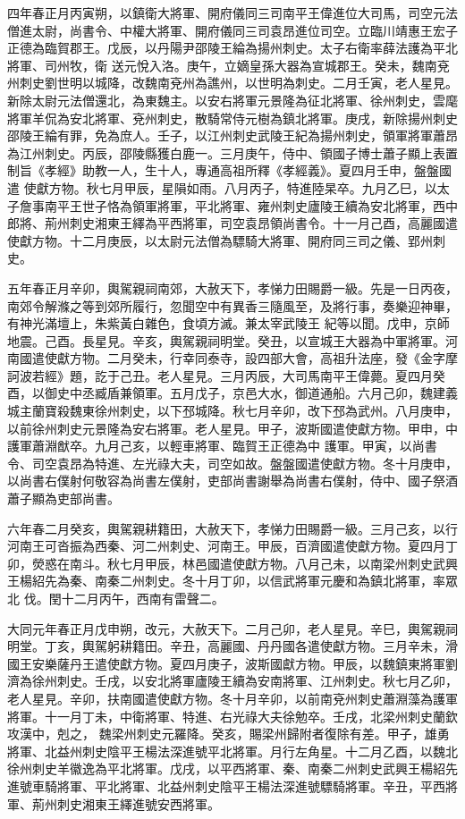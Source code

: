 \begin{pinyinscope}
 四年春正月丙寅朔，以鎮衛大將軍、開府儀同三司南平王偉進位大司馬，司空元法僧進太尉，尚書令、中權大將軍、開府儀同三司袁昂進位司空。立臨川靖惠王宏子正德為臨賀郡王。戊辰，以丹陽尹邵陵王綸為揚州刺史。太子右衛率薛法護為平北將軍、司州牧，衛
 送元悅入洛。庚午，立嫡皇孫大器為宣城郡王。癸未，魏南兗州刺史劉世明以城降，改魏南兗州為譙州，以世明為刺史。二月壬寅，老人星見。新除太尉元法僧還北，為東魏主。以安右將軍元景隆為征北將軍、徐州刺史，雲麾將軍羊侃為安北將軍、兗州刺史，散騎常侍元樹為鎮北將軍。庚戌，新除揚州刺史邵陵王綸有罪，免為庶人。壬子，以江州刺史武陵王紀為揚州刺史，領軍將軍蕭昂為江州刺史。丙辰，邵陵縣獲白鹿一。三月庚午，侍中、領國子博士蕭子顯上表置制旨《孝經》助教一人，生十人，專通高祖所釋《孝經義》。夏四月壬申，盤盤國遣
 使獻方物。秋七月甲辰，星隕如雨。八月丙子，特進陸杲卒。九月乙巳，以太子詹事南平王世子恪為領軍將軍，平北將軍、雍州刺史廬陵王續為安北將軍，西中郎將、荊州刺史湘東王繹為平西將軍，司空袁昂領尚書令。十一月己酉，高麗國遣使獻方物。十二月庚辰，以太尉元法僧為驃騎大將軍、開府同三司之儀、郢州刺史。



 五年春正月辛卯，輿駕親祠南郊，大赦天下，孝悌力田賜爵一級。先是一日丙夜，南郊令解滌之等到郊所履行，忽聞空中有異香三隨風至，及將行事，奏樂迎神畢，有神光滿壇上，朱紫黃白雜色，食頃方滅。兼太宰武陵王
 紀等以聞。戊申，京師地震。己酉。長星見。辛亥，輿駕親祠明堂。癸丑，以宣城王大器為中軍將軍。河南國遣使獻方物。二月癸未，行幸同泰寺，設四部大會，高祖升法座，發《金字摩訶波若經》題，訖于己丑。老人星見。三月丙辰，大司馬南平王偉薨。夏四月癸酉，以御史中丞臧盾兼領軍。五月戊子，京邑大水，御道通船。六月己卯，魏建義城主蘭寶殺魏東徐州刺史，以下邳城降。秋七月辛卯，改下邳為武州。八月庚申，以前徐州刺史元景隆為安右將軍。老人星見。甲子，波斯國遣使獻方物。甲申，中護軍蕭淵猷卒。九月己亥，以輕車將軍、臨賀王正德為中
 護軍。甲寅，以尚書令、司空袁昂為特進、左光祿大夫，司空如故。盤盤國遣使獻方物。冬十月庚申，以尚書右僕射何敬容為尚書左僕射，吏部尚書謝舉為尚書右僕射，侍中、國子祭酒蕭子顯為吏部尚書。



 六年春二月癸亥，輿駕親耕籍田，大赦天下，孝悌力田賜爵一級。三月己亥，以行河南王可沓振為西秦、河二州刺史、河南王。甲辰，百濟國遣使獻方物。夏四月丁卯，熒惑在南斗。秋七月甲辰，林邑國遣使獻方物。八月己未，以南梁州刺史武興王楊紹先為秦、南秦二州刺史。冬十月丁卯，以信武將軍元慶和為鎮北將軍，率眾北
 伐。閏十二月丙午，西南有雷聲二。



 大同元年春正月戊申朔，改元，大赦天下。二月己卯，老人星見。辛巳，輿駕親祠明堂。丁亥，輿駕躬耕籍田。辛丑，高麗國、丹丹國各遣使獻方物。三月辛未，滑國王安樂薩丹王遣使獻方物。夏四月庚子，波斯國獻方物。甲辰，以魏鎮東將軍劉濟為徐州刺史。壬戌，以安北將軍廬陵王續為安南將軍、江州刺史。秋七月乙卯，老人星見。辛卯，扶南國遣使獻方物。冬十月辛卯，以前南兗州刺史蕭淵藻為護軍將軍。十一月丁未，中衛將軍、特進、右光祿大夫徐勉卒。壬戌，北梁州刺史蘭欽攻漢中，剋之，
 魏梁州刺史元羅降。癸亥，賜梁州歸附者復除有差。甲子，雄勇將軍、北益州刺史陰平王楊法深進號平北將軍。月行左角星。十二月乙酉，以魏北徐州刺史羊徽逸為平北將軍。戊戌，以平西將軍、秦、南秦二州刺史武興王楊紹先進號車騎將軍、平北將軍、北益州刺史陰平王楊法深進號驃騎將軍。辛丑，平西將軍、荊州刺史湘東王繹進號安西將軍。




\end{pinyinscope}
